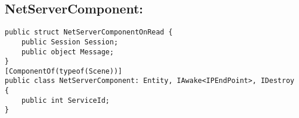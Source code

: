 \documentclass[9pt, b5paper]{article}
\begin{document}
\subsection{NetServerComponent:}
\label{sec:orgf12de06}
\begin{verbatim}
public struct NetServerComponentOnRead {
    public Session Session;
    public object Message;
}
[ComponentOf(typeof(Scene))]
public class NetServerComponent: Entity, IAwake<IPEndPoint>, IDestroy {
    public int ServiceId;
}
\end{verbatim}
\end{document}
